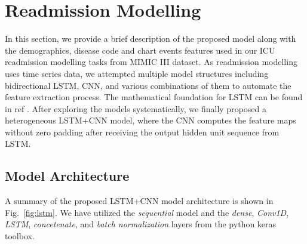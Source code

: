 \documentclass[letterpaper, 10pt, conference]{ieeeconf} %
\newcommand{\fig}[1]{Fig.~\ref{#1}}
\begin{document}






\section{Readmission Modelling}\label{sec:methods}
In this section, we provide a brief description of the proposed model along with the demographics, disease code and chart events features used in  our ICU readmission modelling tasks from MIMIC III dataset. As readmission modelling uses time series data, we attempted multiple model structures including bidirectional LSTM, CNN, and various combinations of them to automate the feature extraction process. The mathematical foundation for LSTM can be found in ref \cite{zebin2018human,lin2018analysis}. After exploring the models systematically, we finally proposed a heterogeneous LSTM+CNN model, where the CNN computes the feature maps without zero padding after receiving the output hidden unit sequence from LSTM. 

\subsection{Model Architecture}

A summary of the  proposed LSTM+CNN model architecture is shown in \fig{fig:lstm}. We have utilized the \emph{sequential} model and the \emph{dense}, \emph{Conv1D}, \emph{LSTM}, \emph{concetenate}, and \emph{batch normalization} layers from the python keras toolbox. 
\end{document}
